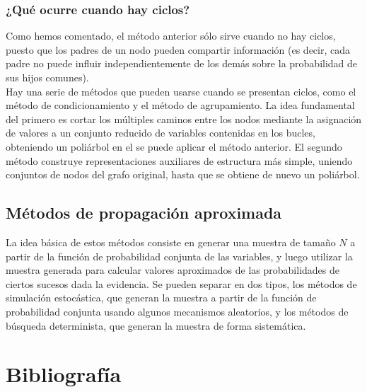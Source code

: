 \documentclass{article}
\theoremstyle{definition_wo_parentheses}
\begin{document}
\subsubsection{¿Qué ocurre cuando hay ciclos?}
Como hemos comentado, el método anterior sólo sirve cuando no hay ciclos, puesto que los padres de un nodo pueden compartir información (es decir, cada padre no puede influir independientemente de los demás sobre la probabilidad de sus hijos comunes).\\
Hay una serie de métodos que pueden usarse cuando se presentan ciclos, como el método de condicionamiento y el método de agrupamiento. La idea fundamental del primero es cortar los múltiples caminos entre los nodos mediante la asignación de valores a un conjunto reducido de variables contenidas en los bucles, obteniendo un poliárbol en el se puede aplicar el método anterior. El segundo método construye representaciones auxiliares de estructura más simple, uniendo conjuntos de nodos del grafo original, hasta que se obtiene de nuevo un poliárbol.

\subsection{Métodos de propagación aproximada}

La idea básica de estos métodos consiste en generar una muestra de tamaño $N$ a partir de la función de probabilidad conjunta de las variables, y luego utilizar la muestra generada para calcular valores aproximados de las probabilidades de ciertos sucesos dada la evidencia. Se pueden separar en dos tipos, los métodos de simulación estocástica, que generan la muestra a partir de la función de probabilidad conjunta usando algunos mecanismos aleatorios, y los métodos de búsqueda determinista, que generan la muestra de forma sistemática.

\section{Bibliografía}
\end{document}
